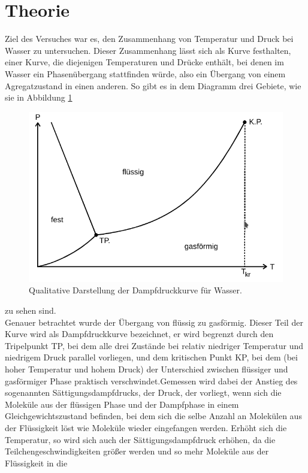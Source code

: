 \section{Theorie}
\label{sec:Theorie}
Ziel des Versuches war es, den Zusammenhang von Temperatur und Druck bei Wasser 
zu untersuchen. Dieser Zusammenhang lässt sich als Kurve festhalten,
einer Kurve, die diejenigen Temperaturen und Drücke enthält, bei denen im Wasser
ein Phasenübergang stattfinden würde, also ein Übergang von einem Agregatzustand
in einen anderen. So gibt es in dem Diagramm drei Gebiete, wie sie in Abbildung \ref{fig:kurve}
\begin{figure}
    \centering
    \includegraphics[width=\textwidth]{dampfdruckkurve.png}
    \caption{Qualitative Darstellung der Dampfdruckkurve für Wasser.}
    \label{fig:kurve}
\end{figure}
zu sehen sind. \\
Genauer betrachtet wurde der Übergang von flüssig zu gasförmig. Dieser Teil der Kurve wird als
Dampfdruckkurve bezeichnet, er wird begrenzt durch den Tripelpunkt TP, bei dem alle drei Zustände
bei relativ niedriger Temperatur und niedrigem Druck parallel vorliegen, und dem kritischen
Punkt KP, bei dem (bei hoher Temperatur und hohem Druck) der Unterschied zwischen flüssiger und
gasförmiger Phase praktisch verschwindet.Gemessen wird dabei der Anstieg des sogenannten Sättigungsdampfdrucks,
der Druck, der vorliegt, wenn sich die Moleküle aus der flüssigen Phase und der Dampfphase in einem 
Gleichgewichtszustand befinden, bei dem sich die selbe Anzahl an Molekülen aus der Flüssigkeit löst wie 
Moleküle wieder eingefangen werden. Erhöht sich die Temperatur, so wird sich auch der Sättigungsdampfdruck 
erhöhen, da die Teilchengeschwindigkeiten größer werden und so mehr Moleküle aus der Flüssigkeit in die 

